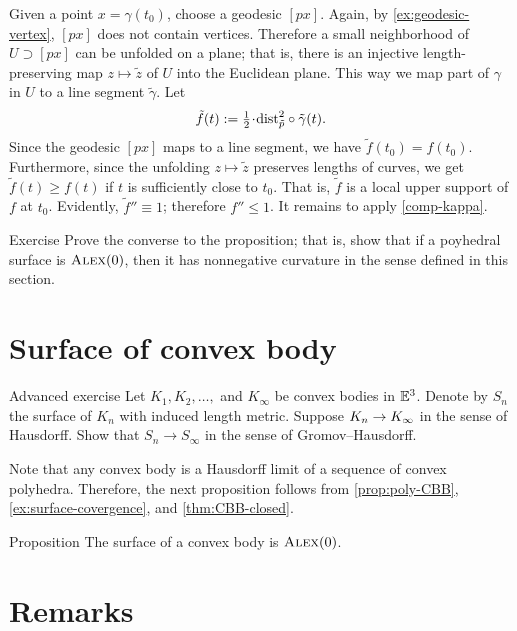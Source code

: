 Given a point $x=\gamma(t_0)$, choose a geodesic $[px]$.
Again, by \ref{ex:geodesic-vertex}, $[px]$ does not contain vertices.
Therefore a small neighborhood of $U\supset [px]$ can be unfolded on a plane;
that is, there is an injective length-preserving map $z\mapsto \tilde z$
of $U$ into the Euclidean plane.
This way we map part of $\gamma$ in $U$ to a line segment $\tilde\gamma$.
Let 
\[\tilde f(t)\df\tfrac12\cdot\distfun_{\tilde p}^2\circ\tilde \gamma(t).\]
Since the geodesic $[px]$ maps to a line segment, we have $\tilde f(t_0)= f(t_0)$.
Furthermore, since the unfolding $z\mapsto \tilde z$ preserves lengths of curves, we get 
$\tilde f(t)\ge f(t)$ if $t$ is sufficiently close to $t_0$.
That is, $\tilde f$ is a local upper support of $f$ at $t_0$.
Evidently, $\tilde f''\equiv 1$; therefore $f''\le 1$.
It remains to apply \ref{comp-kappa}.
\qeds

\begin{thm}{Exercise}\label{ex:poly-CBB}
Prove the converse to the proposition;
that is, show that if a poyhedral surface is $\textsc{Alex}(0)$, then it has nonnegative curvature in the sense defined in this section.
\end{thm}

\section{Surface of convex body}

\begin{thm}{Advanced exercise}\label{ex:surface-covergence}
Let $K_1,K_2,\dots,$ and $K_\infty$ be convex bodies in $\mathbb{E}^3$.
Denote by $S_n$ the surface of $K_n$ with induced length metric.
Suppose $K_n\to K_\infty$ in the sense of Hausdorff.
Show that $S_n\to S_\infty$ in the sense of Gromov--Hausdorff.
\end{thm}

Note that any convex body is a Hausdorff limit of a sequence of convex polyhedra.
Therefore, the next proposition follows from \ref{prop:poly-CBB}, \ref{ex:surface-covergence}, and \ref{thm:CBB-closed}.

\begin{thm}{Proposition}\label{prop:conv-surf-CBB(0)}
The surface of a convex body is $\textsc{Alex}(0)$.
\end{thm}


\section{Remarks}

